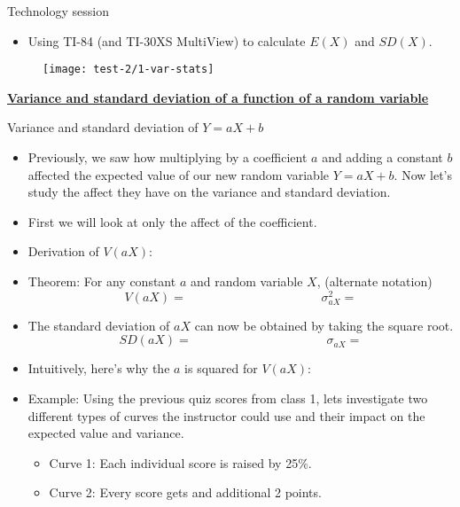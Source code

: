 \documentclass{article}
\newcommand{\bu}[1]{\textbf{\ul{#1}}}				%
\begin{document}
Technology session\bigskip
\begin{itemize}
    \item Using TI-84 (and TI-30XS MultiView) to calculate $E(X)$ and $SD(X)$.
\end{itemize}\bigskip

\begin{figure}[H]
    \center\texttt{[image: test-2/1-var-stats]}
\end{figure}\newpage

\bu{Variance and standard deviation of a function of a random variable}\bigskip

Variance and standard deviation of $Y = aX + b$\bigskip
\begin{itemize}
    \item Previously, we saw how multiplying by a coefficient $a$ and adding a constant $b$ affected the expected value of our new random variable $Y = aX + b$. Now let's study the affect they have on the variance and standard deviation.
    \item First we will look at only the affect of the coefficient.\vspace{80pt}
    \item[] Derivation of $V(aX)$:\vspace{100pt}
    \item Theorem: For any constant $a$ and random variable $X$,\hspace{30pt} (alternate notation)
    \[V(aX) = \hspace{130pt} \sigma^2_{aX} =\]
    \item[] The standard deviation of $aX$ can now be obtained by taking the square root.
    \[SD(aX) = \hspace{130pt} \sigma_{aX} = \]\smallskip
    \item Intuitively, here's why the $a$ is squared for $V(aX)$:\vspace{60pt}
    \item Example: Using the previous quiz scores from class 1, lets investigate two different types of curves the instructor could use and their impact on the expected value and variance.
    \begin{itemize}
        \item Curve 1: Each individual score is raised by 25\%.\vspace{80pt}
        \item Curve 2: Every score gets and additional 2 points.\bigskip\bigskip\\
    \end{itemize}

\end{itemize}
\end{document}
